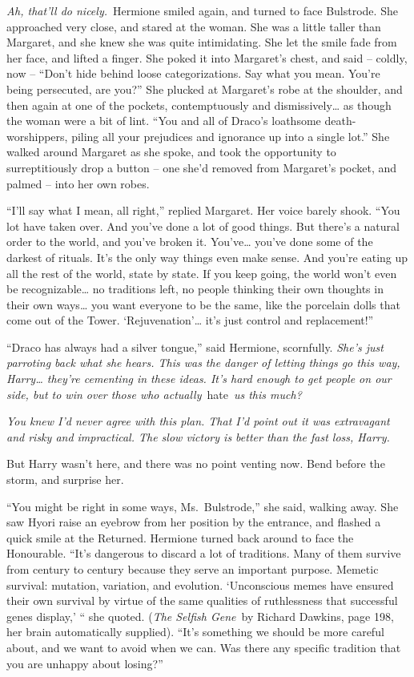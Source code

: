 \emph{Ah, that'll do nicely.}~Hermione smiled again, and turned to face
Bulstrode. She approached very close, and stared at the woman. She was a
little taller than Margaret, and she knew she was quite intimidating.
She let the smile fade from her face, and lifted a finger. She poked it
into Margaret's chest, and said -- coldly, now -- ``Don't hide behind
loose categorizations. Say what you mean. You're being persecuted, are
you?'' She plucked at Margaret's robe at the shoulder, and then again at
one of the pockets, contemptuously and dismissively\ldots{} as though
the woman were a bit of lint. ``You and all of Draco's loathsome
death-worshippers, piling all your prejudices and ignorance up into a
single lot.'' She walked around Margaret as she spoke, and took the
opportunity to surreptitiously drop a button -- one she'd removed from
Margaret's pocket, and palmed -- into her own robes.

``I'll say what I mean, all right,'' replied Margaret. Her voice barely
shook. ``You lot have taken over. And you've done a lot of good things.
But there's a natural order to the world, and you've broken it.
You've\ldots{} you've done some of the darkest of rituals. It's the only
way things even make sense. And you're eating up all the rest of the
world, state by state. If you keep going, the world won't even be
recognizable\ldots{} no traditions left, no people thinking their own
thoughts in their own ways\ldots{} you want everyone to be the same,
like the porcelain dolls that come out of the Tower.
`Rejuvenation'\ldots{} it's just control and replacement!''

``Draco has always had a silver tongue,'' said Hermione, scornfully.
\emph{She's just parroting back what she hears. This was the danger of
letting things go this way, Harry\ldots{} they're cementing in these
ideas. It's hard enough to get people on our side, but to win over those
who actually}~hate~\emph{us this much?}

\emph{You knew I'd never agree with this plan. That I'd point out it was
extravagant and risky and impractical. The slow victory is better than
the fast loss, Harry.}

But Harry wasn't here, and there was no point venting now. Bend before
the storm, and surprise her.

``You might be right in some ways, Ms.~Bulstrode,'' she said, walking
away. She saw Hyori raise an eyebrow from her position by the entrance,
and flashed a quick smile at the Returned. Hermione turned back around
to face the Honourable. ``It's dangerous to discard a lot of traditions.
Many of them survive from century to century because they serve an
important purpose. Memetic survival: mutation, variation, and evolution.
`Unconscious memes have ensured their own survival by virtue of the same
qualities of ruthlessness that successful genes display,' `` she quoted.
(\emph{The Selfish Gene}~by Richard Dawkins, page 198, her brain
automatically supplied). ``It's something we should be more careful
about, and we want to avoid when we can. Was there any specific
tradition that you are unhappy about losing?''

